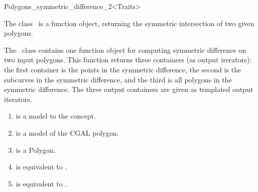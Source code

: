 
\ccRefPageBegin



\begin{ccRefFunctionObjectClass}{Polygons_symmetric_difference_2<Traits>}
\label{OVL_sec:polygon_symmetric_difference}
    
\ccDefinition
The class \ccClassTemplateName\ is a function object,
returning the symmetric intersection of two given polygons.


  

The \ccClassTemplateName\ class contains one function
object for computing symmetric difference on two input polygons.
This function returns three containers (as output irerators):
the first container is the points in the symmetric difference, 
the second is the subcurves in the symmetric difference,
and the third is all polygons in the symmetric difference.
The three output containers are given as templated 
output iterators.


\begin{enumerate}
   \item
    is a model to the  concept.
   \item
    is a model of the CGAL polygon.
   \item
    is a Polygon.
   \item    
    is equivalent to .
   \item
    is equivalent to .
\end{enumerate}


\end{ccRefFunctionObjectClass}
